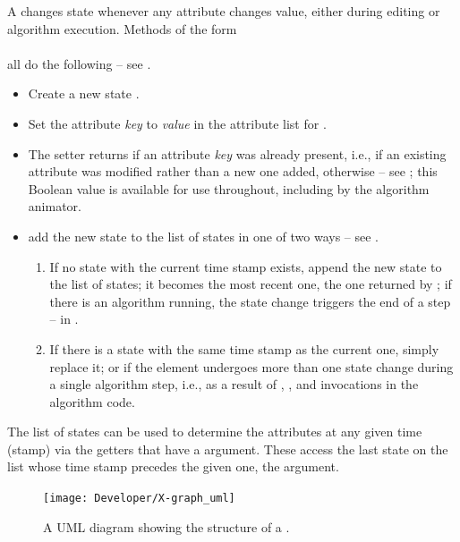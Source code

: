 A  changes state whenever any attribute changes value,
either during editing or algorithm execution. Methods of the form\\
\\
all do the following -- see .
\begin{itemize}
\item Create a new state .
\item Set the attribute \emph{key} to \emph{value} in the attribute list for
  .
\item The setter returns  if an attribute \emph{key} was already
  present, i.e., if an existing attribute was modified rather than a new one
  added,  otherwise -- see ; this Boolean
  value is available for use throughout, including by the algorithm animator.
\item add the new state to the list of states in one of two ways -- see
  .
  \begin{enumerate}
    \item If no state with the current time stamp exists, append the new
      state to the list of states; it becomes the most recent one, the one
      returned by ; if there is an algorithm running, the
      state change triggers the end of a step --
       in .
    \item If there is a state with the same time stamp as the current one,
      simply replace it;
      or if the element undergoes more than one state change during a single
      algorithm step, i.e., as a result of , , and
       invocations in the algorithm code.
  \end{enumerate}
\end{itemize}
The list of states can be used to determine the attributes at any given time
(stamp) via the getters that have a  argument. These access the
last state on the list whose time stamp precedes the given one, the
 argument.

\begin{figure}
  \begin{center}
    \texttt{[image: Developer/X-graph\_uml]}
  \end{center}
  \caption{A UML diagram showing the structure of a .}
  \label{fig:graph_uml}
\end{figure}

